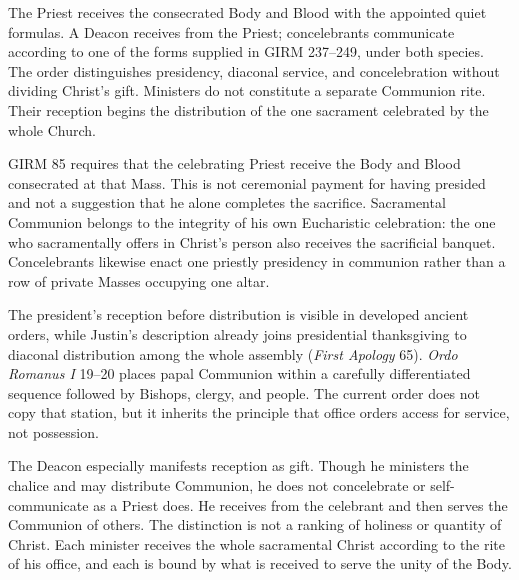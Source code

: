 
The Priest receives the consecrated Body and Blood with the appointed quiet formulas. A Deacon receives from the Priest; concelebrants communicate according to one of the forms supplied in GIRM 237--249, under both species. The order distinguishes presidency, diaconal service, and concelebration without dividing Christ's gift. Ministers do not constitute a separate Communion rite. Their reception begins the distribution of the one sacrament celebrated by the whole Church.

GIRM 85 requires that the celebrating Priest receive the Body and Blood consecrated at that Mass. This is not ceremonial payment for having presided and not a suggestion that he alone completes the sacrifice. Sacramental Communion belongs to the integrity of his own Eucharistic celebration: the one who sacramentally offers in Christ's person also receives the sacrificial banquet. Concelebrants likewise enact one priestly presidency in communion rather than a row of private Masses occupying one altar.

The president's reception before distribution is visible in developed ancient orders, while Justin's description already joins presidential thanksgiving to diaconal distribution among the whole assembly (\emph{First Apology} 65). \emph{Ordo Romanus I} 19--20 places papal Communion within a carefully differentiated sequence followed by Bishops, clergy, and people. The current order does not copy that station, but it inherits the principle that office orders access for service, not possession.

The Deacon especially manifests reception as gift. Though he ministers the chalice and may distribute Communion, he does not concelebrate or self-communicate as a Priest does. He receives from the celebrant and then serves the Communion of others. The distinction is not a ranking of holiness or quantity of Christ. Each minister receives the whole sacramental Christ according to the rite of his office, and each is bound by what is received to serve the unity of the Body.


